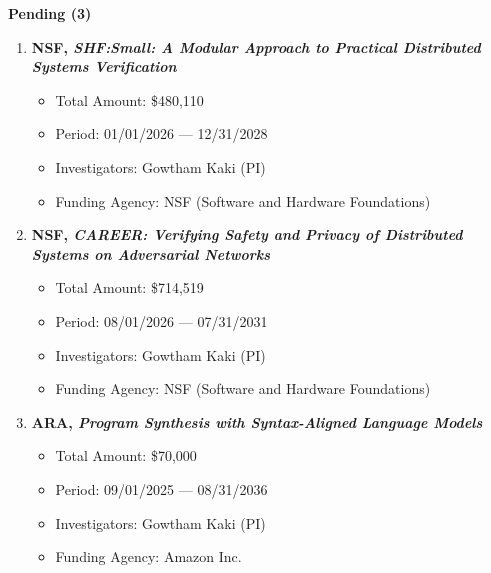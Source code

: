 \documentclass{article}
\begin{document}
\medskip

\noindent\textbf{Pending (3)}
\begin{enumerate}
  \item {\bf NSF, \emph{SHF:Small: A Modular Approach to Practical Distributed Systems Verification}}
  \begin{itemize}
    \item 
      Total Amount: \$480,110
    \item 
      Period: 01/01/2026 --- 12/31/2028
    \item 
      Investigators: Gowtham Kaki (PI)
    \item 
      Funding Agency: NSF (Software and Hardware Foundations)
\end{itemize}  

  \item {\bf NSF, \emph{CAREER: Verifying Safety and Privacy of Distributed
  Systems on Adversarial Networks}}
  \begin{itemize}
    \item 
      Total Amount: \$714,519
    \item 
      Period: 08/01/2026 --- 07/31/2031
    \item 
      Investigators: Gowtham Kaki (PI)
    \item 
      Funding Agency: NSF (Software and Hardware Foundations)
  \end{itemize}

  \item {\bf ARA, \emph{Program Synthesis with Syntax-Aligned Language Models}}
  \begin{itemize}
    \item 
      Total Amount: \$70,000
    \item 
      Period: 09/01/2025 --- 08/31/2036
    \item 
      Investigators: Gowtham Kaki (PI)
    \item 
      Funding Agency: Amazon Inc.
  \end{itemize}
  
\end{enumerate}
\end{document}
